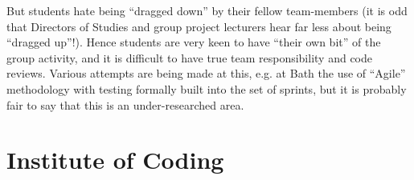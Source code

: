 \documentclass[sigconf,anonymous]{acmart}
\begin{document}
But students hate being ``dragged down'' by their fellow team-members (it is odd that Directors of Studies and group project lecturers hear far less about being ``dragged up''!).  Hence students are very keen to have ``their own bit'' of the group activity, and it is difficult to have true team responsibility and code reviews.  Various attempts are being made at this, e.g. at Bath the use of ``Agile'' methodology with testing formally built into the  set of sprints, but it is probably fair to say that this is an under-researched area.

\section{Institute of Coding}
\end{document}
